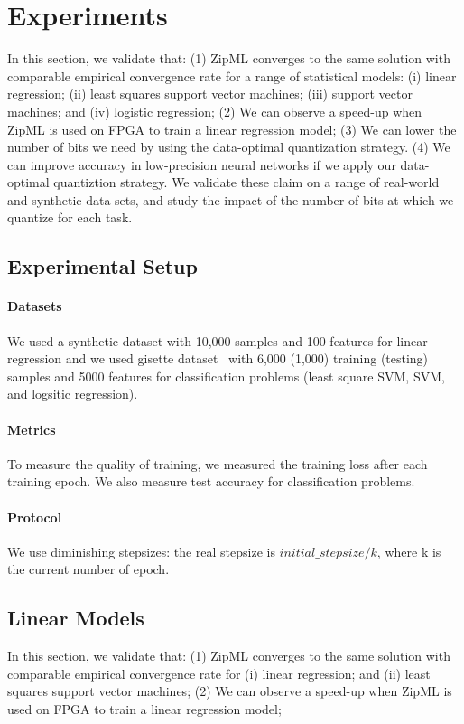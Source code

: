\documentclass{article}
\begin{document}
\section{Experiments} \label{sec:exp}

In this section, we validate that: (1) ZipML 
converges to the same solution with comparable
empirical convergence rate for a range of
statistical models: (i) linear regression;
(ii) least squares support vector machines;
(iii) support vector machines; and (iv) logistic regression;
(2) We can observe a speed-up when ZipML is used on FPGA to train a linear regression model;
(3) We can lower the number of bits we need by using the data-optimal
quantization strategy.
(4) We can improve accuracy in low-precision neural networks if we apply our data-optimal quantiztion strategy.
We validate these claim on a range of real-world
and synthetic data sets, and study the impact
of the number of bits at which we quantize for each task.


\subsection{Experimental Setup}

\paragraph{Datasets} 
We used a synthetic dataset with 10,000 samples and 100 features for linear regression and we used gisette dataset~\cite{guyon2004result} with 6,000 (1,000) training (testing) samples and 5000 features for classification problems (least square SVM, SVM, and logsitic regression).

\paragraph{Metrics} To measure the quality of training,
we measured the training loss after each training epoch. We also measure test accuracy for classification problems.

\paragraph{Protocol} We use diminishing stepsizes: the real stepsize is ${initial\_stepsize/k}$, where k is the current number of epoch.

\subsection{Linear Models}
In this section, we validate that: (1) ZipML 
converges to the same solution with comparable
empirical convergence rate for (i) linear regression;
and (ii) least squares support vector machines;
(2) We can observe a speed-up when ZipML is used on FPGA to train a linear regression model;
\end{document}
